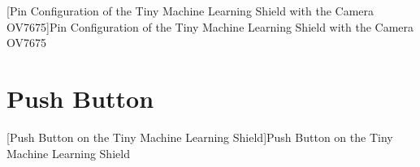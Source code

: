 \begin{center}
    
    [Pin Configuration of the Tiny Machine Learning Shield with the Camera OV7675]{Pin Configuration of the Tiny Machine Learning Shield with the Camera OV7675 \cite{ArduinoShield:2021}}\label{fig:TinyMLShieldPinsOV7675}
    \end{center}
    

\section{Push Button}

\begin{center}
	
	
	[Push Button on the Tiny Machine Learning Shield]{Push Button on the Tiny Machine Learning Shield}
	\label{fig:TinyMLShield}
\end{center}

